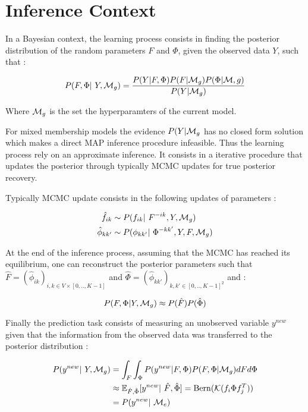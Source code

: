 \section{Inference Context}

In a Bayesian context, the learning process consists in finding the posterior distribution of the random parameters $F$ and $\Phi$, given the observed data $Y$, such that : 

\begin{equation}
    \p(F, \Phi | Y, \M_g) = \frac{\p(Y|F,\Phi)\p(F|\M_g)\p(\Phi|\M,g)}{\p(Y|\M_g)}
\end{equation}

Where $\mathcal{M}_g$ is the set the hyperparamters of the current model.


For mixed membership models the evidence $P(Y|\mathcal{M}_g$ has no closed form solution which makes a direct MAP inference procedure infeasible. Thus the learning process rely on an approximate inference. It consists in a iterative procedure that updates the posterior through typically MCMC updates for true posterior recovery.

Typically MCMC update consists in the following updates of parameters :  

\begin{align}
    \hat f_{ik} &\sim \p(f_{ik} | F^{-ik}, Y, \M_g) \\
    \hat \phi_{kk'} &\sim \p(\phi_{kk'} | \Phi^{-kk'}, Y, F, \M_g)
\end{align}

At the end of the inference process, assuming that the MCMC has reached its  equilibrium, one can reconstruct the posterior parameters such that $\hat F = (\hat \phi_{ik})_{i,k \in V\times[0,.., K-1]}$ and $\hat \Phi = (\hat \phi_{kk'})_{k,k' \in [0,.., K-1]^2}$ and :

\begin{equation}
    P(F, \Phi|Y, \mathcal{M}_g) \approx P(\hat F) P(\hat \Phi)
\end{equation}

Finally the prediction task consists of measuring an unobserved variable $y^{new}$ given that the information from the observed data was transferred to the posterior distribution : 

\begin{align*}
    \p(y^{new} | Y, \M_g) &= \int_F \int_\Phi \p(y^{new}|F,\Phi) \p(F,\Phi|\M_g) dF d\Phi \\
                          &\approx \E_{\hat F, \hat \Phi} [y^{new} | \hat F, \hat \Phi] = \mathrm{Bern}(\mathcal{K}(f_i \Phi f_j^T)) \\
                          &= \p(y^{new} | \M_e)
\end{align*}

